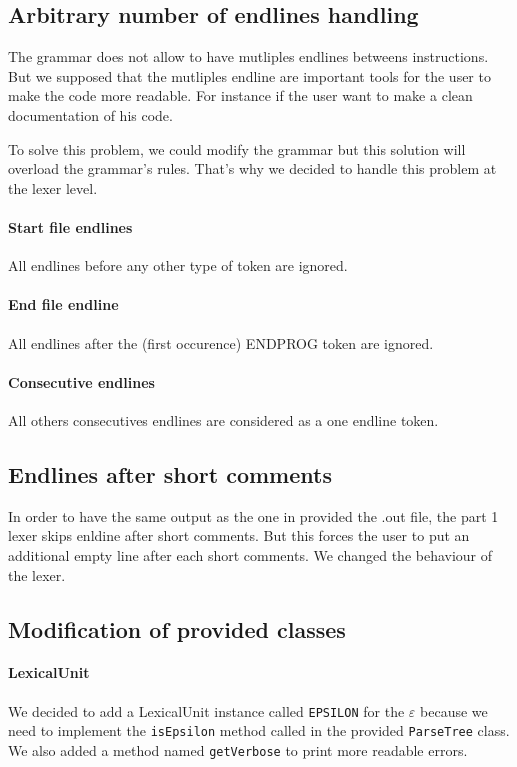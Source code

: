 \documentclass[12pt]{article}
\begin{document}
\subsection{Arbitrary number of endlines handling}
The grammar does not allow to have mutliples endlines betweens instructions. But we supposed that
the mutliples endline are important tools for the user to make the code more readable.
For instance if the user want to make a clean documentation of his code.

To solve this problem, we could modify the grammar but
this solution will overload the grammar's rules.
That's why we decided to handle this problem at the lexer level.

\paragraph{Start file endlines}
All endlines before any other type of token are ignored.

\paragraph{End file endline}
All endlines after the (first occurence) ENDPROG token are ignored.

\paragraph{Consecutive endlines}
All others consecutives endlines are considered as a one endline token.

\subsection{Endlines after short comments}
In order to have the same output as the one in provided the .out file, the part 1 lexer 
skips enldine after short comments. But this forces the user to put an additional empty line after
each short comments. We changed the behaviour of the lexer.

\subsection{Modification of provided classes}

\paragraph{LexicalUnit}
We decided to add a LexicalUnit instance called \texttt{EPSILON} for the $ \varepsilon $ because we need to implement the
\texttt{isEpsilon} method called in the provided \texttt{ParseTree} class. We also added
a method named \texttt{getVerbose} to print more readable errors.
\end{document}
